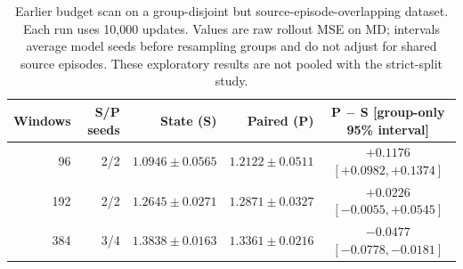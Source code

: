 \begin{table}[t]
\centering
\caption{Earlier budget scan on a group-disjoint but source-episode-overlapping dataset. Each run uses 10,000 updates. Values are raw rollout MSE on MD; intervals average model seeds before resampling groups and do not adjust for shared source episodes. These exploratory results are not pooled with the strict-split study.}
\label{tab:scaling}
\footnotesize
\setlength{\tabcolsep}{5pt}
\renewcommand{\arraystretch}{1.12}
\begin{tabular}{rrr rc}
\toprule
Windows & S/P seeds & State (S) & Paired (P) & P $-$ S [group-only 95\% interval] \\
\midrule
96 & 2/2 & $1.0946\pm0.0565$ & $1.2122\pm0.0511$ & $+0.1176$ $[+0.0982,+0.1374]$ \\
192 & 2/2 & $1.2645\pm0.0271$ & $1.2871\pm0.0327$ & $+0.0226$ $[-0.0055,+0.0545]$ \\
384 & 3/4 & $1.3838\pm0.0163$ & $1.3361\pm0.0216$ & $-0.0477$ $[-0.0778,-0.0181]$ \\
\bottomrule
\end{tabular}
\end{table}
